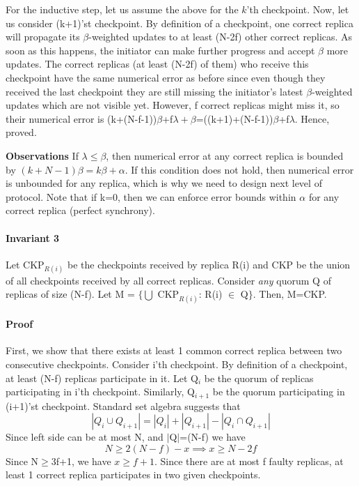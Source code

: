 \documentclass[letterpaper,twocolumn,10pt]{article}
\begin{document}
For the inductive step, let us assume the above for the $k$'th checkpoint. Now, let
us consider (k+1)'st checkpoint. By definition of a checkpoint,
one correct replica will propagate its $\beta$-weighted updates to at least
(N-2f) other correct replicas. As soon as this happens, the initiator
can make further progress and accept $\beta$ more updates.
The correct replicas (at least (N-2f) of them) who receive this checkpoint have the
same numerical error as before since even though they received the last checkpoint
they are still missing the initiator's latest $\beta$-weighted updates
which are not visible yet. However, f correct replicas
might miss it, so their numerical error is (k+(N-f-1))$\beta$+f$\lambda
+\beta$=((k+1)+(N-f-1))$\beta$+f$\lambda$. Hence, proved.

\textbf{Observations}
If $\lambda\le\beta$, then numerical error at any
correct replica is bounded by $(k+N-1)\beta = k\beta + \alpha$.
If this condition does not hold, then numerical error is 
unbounded for any replica, which is why we need to design next
level of protocol. Note that if
k=0, then we can enforce error bounds within $\alpha$ for
any correct replica (perfect synchrony).

\paragraph{Invariant 3} Let CKP$_{R(i)}$ be the checkpoints
received by replica R(i) and CKP be the union of all checkpoints 
received by all correct replicas. 
Consider \textit{any} quorum Q of replicas of size (N-f). Let M = $\{\bigcup$
CKP$_{R(i)}$: R(i) $\in$ Q$\}$. Then, M=CKP.

\paragraph{Proof} First, we show that there exists at least 1 common
correct replica between two consecutive checkpoints. Consider i'th
checkpoint. By definition of a checkpoint, at least (N-f) replicas
participate in it. Let Q$_{i}$ be the quorum of replicas participating
in i'th checkpoint. Similarly, Q$_{i+1}$ be the quorum participating
in (i+1)'st checkpoint. Standard set algebra suggests that
\[
|Q_{i} \cup Q_{i+1}| = |Q_{i}| + |Q_{i+1}| - |Q_{i} \cap
Q_{i+1}| 
\]
Since left side can be at most N, and $|$Q$|$=(N-f) we have
\[
N \ge 2(N-f) - x 
\implies x \ge N-2f
\]
Since N$\ge$3f+1, we have $x \ge f+1$. Since there are at most
f faulty replicas, at least 1 correct replica participates in two
given checkpoints.
\end{document}
